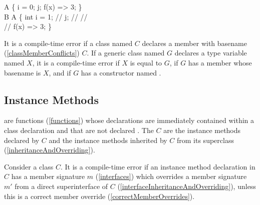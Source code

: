 \documentclass[makeidx]{article}
\begin{document}

\begin{dartCode}
\CLASS{} A \{
  \VAR{} i = 0;
  \VAR{} j;
  f(x) => 3;
\}
\\
\CLASS{} B \EXTENDS{} A \{
  int i = 1; // 
  \STATIC{} j; // 
  // 
\\
  // 
  \STATIC{} f(x) => 3;
\}
\end{dartCode}

\LMHash{}%
It is a compile-time error if a class named $C$ declares
a member with basename (\ref{classMemberConflicts}) $C$.
If a generic class named $G$ declares a type variable named $X$,
it is a compile-time error
if $X$ is equal to $G$,
if $G$ has a member whose basename is $X$,
and if $G$ has a constructor named .


\subsection{Instance Methods}

\LMHash{}%
are functions (\ref{functions})
whose declarations are immediately contained within a class declaration
and that are not declared \STATIC{}.
The  $C$ are the instance methods declared by $C$
and the instance methods inherited by $C$ from its superclass
(\ref{inheritanceAndOverriding}).

\LMHash{}%
Consider a class $C$.
It is a compile-time error if an instance method declaration in $C$ has
a member signature $m$
(\ref{interfaces})
which overrides a member signature $m'$
from a direct superinterface of $C$
(\ref{interfaceInheritanceAndOverriding}),
unless this is a correct member override
(\ref{correctMemberOverrides}).

\end{document}
